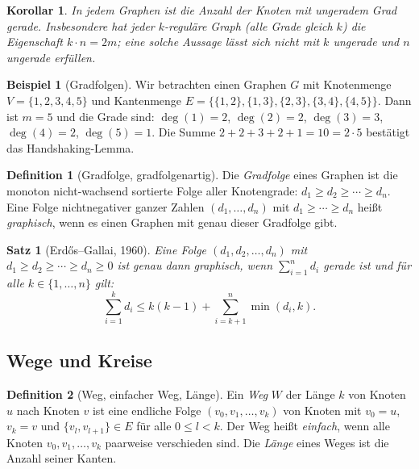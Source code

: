 ﻿\documentclass[a4paper,12pt,openany,oneside]{book}
\theoremstyle{definition}
\newtheorem{definition}{Definition}[chapter]
\newtheorem{beispiel}{Beispiel}[chapter]
\theoremstyle{plain}
\newtheorem{satz}{Satz}[chapter]
\newtheorem{korollar}{Korollar}[chapter]
\theoremstyle{remark}
\begin{document}
\begin{korollar}
  In jedem Graphen ist die Anzahl der Knoten mit ungeradem Grad gerade.
  Insbesondere hat jeder $k$-regul\"are Graph (alle Grade gleich $k$) die
  Eigenschaft $k \cdot n = 2m$; eine solche Aussage l\"asst sich nicht mit
  $k$ ungerade und $n$ ungerade erf\"ullen.
\end{korollar}

\begin{beispiel}[Gradfolgen]
  Wir betrachten einen Graphen $G$ mit Knotenmenge $V = \{1,2,3,4,5\}$ und
  Kantenmenge $E = \{\{1,2\},\{1,3\},\{2,3\},\{3,4\},\{4,5\}\}$. Dann ist
  $m = 5$ und die Grade sind: $\deg(1) = 2$, $\deg(2) = 2$, $\deg(3) = 3$,
  $\deg(4) = 2$, $\deg(5) = 1$. Die Summe $2+2+3+2+1 = 10 = 2 \cdot 5$
  best\"atigt das Handshaking-Lemma.
\end{beispiel}

\begin{definition}[Gradfolge, gradfolgenartig]
  Die \emph{Gradfolge} eines Graphen ist die monoton nicht-wachsend sortierte
  Folge aller Knotengrade: $d_1 \geq d_2 \geq \cdots \geq d_n$.
  Eine Folge nichtnegativer ganzer Zahlen $(d_1, \ldots, d_n)$ mit
  $d_1 \geq \cdots \geq d_n$ hei\ss{}t \emph{graphisch}, wenn es einen
  Graphen mit genau dieser Gradfolge gibt.
\end{definition}

\begin{satz}[Erd\H{o}s--Gallai, 1960]
  Eine Folge $(d_1, d_2, \ldots, d_n)$ mit $d_1 \geq d_2 \geq \cdots \geq
  d_n \geq 0$ ist genau dann graphisch, wenn $\sum_{i=1}^n d_i$ gerade ist
  und f\"ur alle $k \in \{1,\ldots,n\}$ gilt:
  \[
    \sum_{i=1}^k d_i \leq k(k-1) + \sum_{i=k+1}^n \min(d_i, k).
  \]
\end{satz}

\subsection{Wege und Kreise}

\begin{definition}[Weg, einfacher Weg, L\"ange]
  Ein \emph{Weg} $W$ der L\"ange $k$ von Knoten $u$ nach Knoten $v$ ist eine
  endliche Folge $(v_0, v_1, \ldots, v_k)$ von Knoten mit $v_0 = u$,
  $v_k = v$ und $\{v_l, v_{l+1}\} \in E$ f\"ur alle $0 \leq l < k$.
  Der Weg hei\ss{}t \emph{einfach}, wenn alle Knoten $v_0, v_1, \ldots, v_k$
  paarweise verschieden sind. Die \emph{L\"ange} eines Weges ist die Anzahl
  seiner Kanten.
\end{definition}
\end{document}

